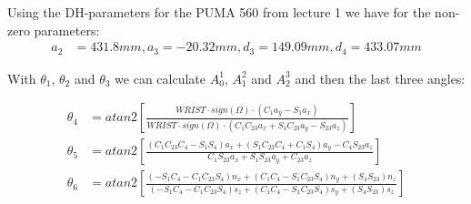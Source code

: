 Using the DH-parameters for the PUMA 560 from lecture 1 we have for the non-zero parameters:
\begin{align*}
a_2 &= 431.8mm, a_3=-20.32mm, d_3=149.09mm, d_4=433.07mm
\end{align*}

With $\theta_1$, $\theta_2$ and $\theta_3$ we can calculate $A_0^1$, $A_1^2$ and $A_2^3$ and then the last three angles:

\begin{align*}
\theta_4 &=atan2\left[\frac{WRIST\cdot sign(\Omega)\cdot(C_1a_y-S_1a_x)}{WRIST\cdot sign(\Omega)\cdot(C_1C_{23}a_x+S_1C_{23}a_y-S_{23}a_z)}\right]\\
\theta_5 &=atan2\left[\frac{(C_1C_{23}C_4-S_1S_4)a_x+(S_1C_{23}C_4+C_1S_4)a_y-C_4S_{23}a_z}{C_1S_{23}a_x+S_1S_{23}a_y+C_{23}a_z}\right]\\
\theta_6 &=atan2\left[\frac{(-S_1C_4-C_1C_{23}S_4)n_x+(C_1C_4-S_1C_{23}S_4)n_y+(S_4S_{23})n_z}{(-S_1C_4-C_1C_{23}S_4)s_z+(C_1C_4-S_1C_{23}S_4)s_y+(S_4S_{23})s_z}\right]
\end{align*}

